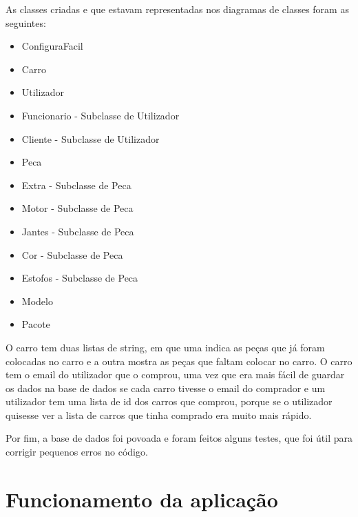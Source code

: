 \documentclass[10pt, a4paper]{article}
\begin{document}
As classes criadas e que estavam representadas nos diagramas de classes foram as seguintes:
\begin{itemize}
\item ConfiguraFacil
\item Carro
\item Utilizador
\item Funcionario - Subclasse de Utilizador
\item Cliente - Subclasse de Utilizador
\item Peca
\item Extra - Subclasse de Peca
\item Motor - Subclasse de Peca
\item Jantes - Subclasse de Peca
\item Cor - Subclasse de Peca
\item Estofos - Subclasse de Peca
\item Modelo
\item Pacote
\end{itemize}

O carro tem duas listas de string, em que uma indica as peças que já foram colocadas no carro e a outra mostra as peças que faltam colocar no carro. O carro tem o email do utilizador que o comprou, uma vez que era mais fácil de guardar os dados na base de dados se cada carro tivesse o email do comprador e um utilizador tem uma lista de id dos carros que comprou, porque se o utilizador quisesse ver a lista de carros que tinha comprado era muito mais rápido.

Por fim, a base de dados foi povoada e foram feitos alguns testes, que foi útil para corrigir pequenos erros no código.

\section{Funcionamento da aplicação}
\end{document}

